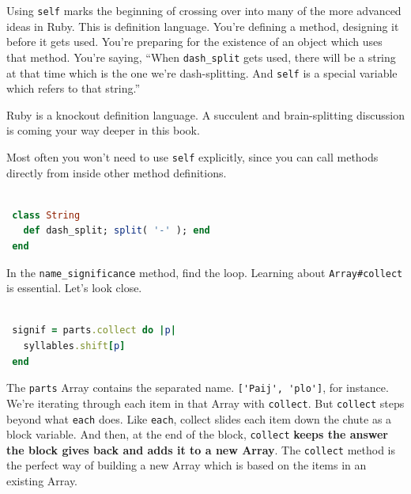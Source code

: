\documentclass[10pt,twoside]{report}
\begin{document}
Using \lstinline[breaklines=true]|self| marks the beginning of
crossing over into many of the more advanced ideas in Ruby. This is
definition language.  You're defining a method, designing it before it
gets used.  You're preparing for the existence of an object which uses
that method.  You're saying, ``When
\lstinline[breaklines=true]|dash_split| gets used, there will be a
string at that time which is the one we're dash-splitting.  And
\lstinline[breaklines=true]|self| is a special variable which refers
to that string.''

Ruby is a knockout definition language.  A succulent and
brain-splitting discussion is coming your way deeper in this book.

Most often you won't need to use \lstinline[breaklines=true]|self|
explicitly, since you can call methods directly from inside other
method definitions.


\begin{lstlisting}[basicstyle=\ttfamily\color{basiccolor},
    commentstyle = \ttfamily\color{commentcolor},
    keywordstyle=\ttfamily\color{keywordscolor},
    stringstyle=\color{stringcolor},
    language=Ruby,
    basicstyle=\small\ttfamily,
    showstringspaces=false,
  ]

 class String
   def dash_split; split( '-' ); end
 end

\end{lstlisting}


In the \lstinline[breaklines=true]|name_significance| method, find the
loop.  Learning about \lstinline[breaklines=true]|Array#collect| is
essential. Let's look close.


\begin{lstlisting}[basicstyle=\ttfamily\color{basiccolor},
    commentstyle = \ttfamily\color{commentcolor},
    keywordstyle=\ttfamily\color{keywordscolor},
    stringstyle=\color{stringcolor},
    language=Ruby,
    basicstyle=\small\ttfamily,
    showstringspaces=false,
  ]

 signif = parts.collect do |p|
   syllables.shift[p]
 end

\end{lstlisting}


The \lstinline[breaklines=true]|parts| Array contains the separated
name.  \lstinline[breaklines=true]|['Paij', 'plo']|, for instance.
We're iterating through each item in that Array with
\lstinline[breaklines=true]|collect|.  But
\lstinline[breaklines=true]|collect| steps beyond what
\lstinline[breaklines=true]|each| does.  Like
\lstinline[breaklines=true]|each|, collect slides each item down the
chute as a block variable.  And then, at the end of the block,
\lstinline[breaklines=true]|collect| {\bf keeps the answer the block
  gives back and adds it to a new Array}.  The
\lstinline[breaklines=true]|collect| method is the perfect way of
building a new Array which is based on the items in an existing Array.
\end{document}
